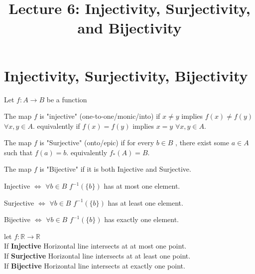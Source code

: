 \documentclass[a4paper,english,12pt]{article}   	%
\title{Lecture 6: Injectivity, Surjectivity, and Bijectivity}
\author{}
\begin{document}
\maketitle

\section { Injectivity, Surjectivity, Bijectivity}
Let $ f \colon A \to B $ be a function
\begin{defn} [Injectivity] The map $f$ is "injective" (one-to-one/monic/into) if $x \neq y $ implies $f(x) \neq f(y) $  $\forall x,y \in A$.
equivalently if $f(x) = f(y) $ implies $x = y $ $\forall x,y \in A$.
\end{defn}
\begin{defn} [Surjectivity] The map $f$ is "Surjective" (onto/epic) if for every $b \in B$ , there exist some $a \in A $ such that $f(a)=b$. equivalently $f_{*}(A)=B$.
\end{defn}
\begin{defn} [Bijectivity] The map $f$ is "Bijective" if it is both Injective and Surjective.
\end{defn}
\begin{rem}
Injective $\Leftrightarrow$  $\forall b \in B$ $ f^{-1}(\{b\})$ has at most one element.
\end{rem}
\begin{rem}
Surjective $\Leftrightarrow$  $\forall b \in B$ $ f^{-1}(\{b\})$ has at least one element.
\end{rem}
\begin{rem}
Bijective $\Leftrightarrow$  $\forall b \in B$ $ f^{-1}(\{b\})$ has exactly one element.
\end{rem}
\begin{exmp}
let $f \colon \mathbb{R} \to \mathbb{R}$ \\
If \textbf{Injective} Horizontal line intersects at at most one point.\\
If \textbf{Surjective} Horizontal line intersects at at least one point.\\
If \textbf{Bijective} Horizontal line intersects at exactly one point.\\
\end{exmp}
\end{document}
